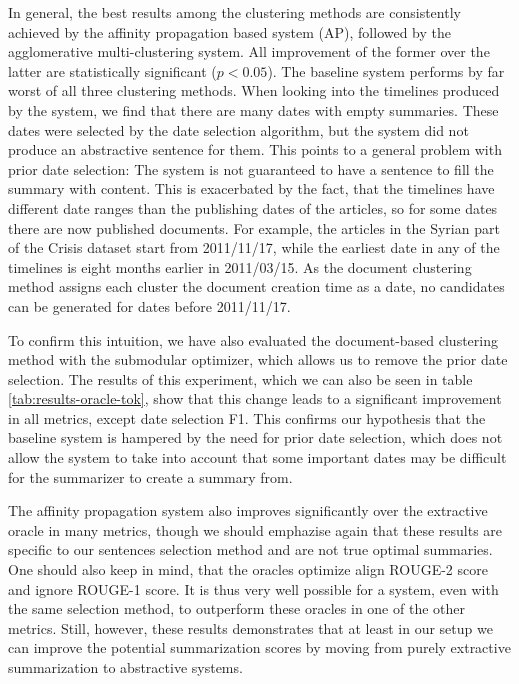 \documentclass[a4paper,BCOR=10mm]{report}
\numberwithin{lemma}{chapter}
\numberwithin{definition}{chapter}
\begin{document}
In general, the best results among the clustering methods are consistently achieved by the affinity propagation based system (AP), followed by the agglomerative multi-clustering system. All improvement of the former over the latter are statistically significant ($p < 0.05$). The baseline system performs by far worst of all three clustering methods. When looking into the timelines produced by the system, we find that there are many dates with empty summaries. These dates were selected by the date selection algorithm, but the system did not produce an abstractive sentence for them. This points to a general problem with prior date selection: The system is not guaranteed to have a sentence to fill the summary with content. This is exacerbated by the fact, that the timelines have different date ranges than the publishing dates of the articles, so for some dates there are now published documents. For example, the articles in the Syrian part of the Crisis dataset start from 2011/11/17, while the earliest date in any of the timelines is eight months earlier in 2011/03/15. As the document clustering method assigns each cluster the document creation time as a date, no candidates can be generated for dates before 2011/11/17.

To confirm this intuition, we have also evaluated the document-based clustering method with the submodular optimizer, which allows us to remove the prior date selection. The results of this experiment, which we can also be seen in table \ref{tab:results-oracle-tok}, show that this change leads to a significant improvement in all metrics, except date selection F1.
This confirms our hypothesis that the baseline system is hampered by the need for prior date selection, which does not allow the system to take into account that some important dates may be difficult for the summarizer to create a summary from.



The affinity propagation system also improves significantly over the extractive oracle in many metrics, though we should emphazise again that these results are specific to our sentences selection method and are not true optimal summaries. One should also keep in mind, that the oracles optimize align ROUGE-2 score and ignore ROUGE-1 score. It is thus very well possible for a system, even with the same selection method, to outperform these oracles in one of the other metrics. Still, however, these results demonstrates that at least in our setup we can improve the potential summarization scores by moving from purely extractive summarization to abstractive systems.
\end{document}
